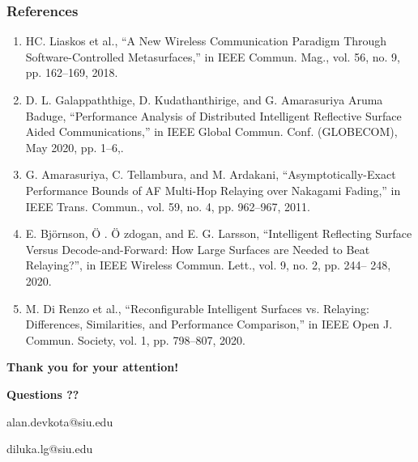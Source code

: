\documentclass[article,mathserif,10pt,envcountsect]{beamer}
\begin{document}
\begin{frame}
\frametitle{References}
\begin{enumerate}
	\item {\color{TUM_blau} HC. Liaskos et al., “{A New Wireless Communication Paradigm Through
		Software-Controlled Metasurfaces},” {in} IEEE Commun. Mag., vol. 56, no. 9,
		pp. 162–169, 2018.}
	
	\item {\color{TUM_blau} D. L. Galappaththige, D. Kudathanthirige, and G. Amarasuriya Aruma
		Baduge, “{Performance Analysis of Distributed Intelligent Reflective Surface
		Aided Communications},” {in} IEEE Global Commun. Conf. (GLOBECOM),
		May 2020, pp. 1–6,.}
		
	\item {\color{TUM_blau} G. Amarasuriya, C. Tellambura, and M. Ardakani, “{Asymptotically-Exact
		Performance Bounds of AF Multi-Hop Relaying over Nakagami Fading},” {in}
		IEEE Trans. Commun., vol. 59, no. 4, pp. 962–967, 2011.}
		
	\item {\color{TUM_blau} E. Bj{\"o}rnson, {\"O} . {\"O} zdogan, and E. G. Larsson, “{Intelligent Reflecting
		Surface Versus Decode-and-Forward: How Large Surfaces are Needed
		to Beat Relaying?}”, {in} IEEE Wireless Commun. Lett., vol. 9, no. 2, pp. 244–
		248, 2020.}
		
	\item {\color{TUM_blau} M. Di Renzo et al., “{Reconfigurable Intelligent Surfaces vs. Relaying:
		Differences, Similarities, and Performance Comparison},” {in} IEEE Open J.
		Commun. Society, vol. 1, pp. 798–807, 2020.}
	
\end{enumerate}



\end{frame}
\begin{frame}
		\begin{center}
		\LARGE \bf Thank you for your attention!
	\end{center}
		\begin{center}
	\bf Questions ?? 
	
	{\color{blue} alan.devkota@siu.edu}
	
	{\color{blue} diluka.lg@siu.edu}
	
\end{center}
\end{frame}



%
%
%
%
\end{document}

